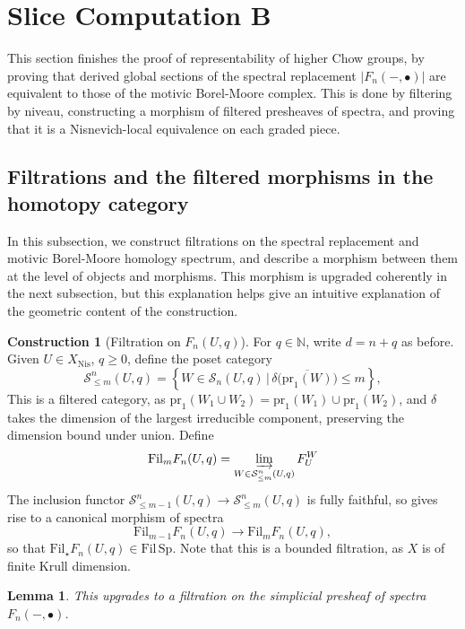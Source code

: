\documentclass[11pt, twoside]{article}
\numberwithin{equation}{section}
\newtheorem{lemma}[equation]{Lemma}
\theoremstyle{definition}
\newtheorem{construction}[equation]{Construction}
\newcommand{\bb}[1]{\mathbb{#1}}
\newcommand{\colim}{\varinjlim}
\newcommand{\pr}{\mathrm{pr}}
\newcommand{\fil}{\mathrm{Fil}}
\newcommand{\Sp}{\mathrm{Sp}}
\newcommand{\nis}{\mathrm{Nis}}
\begin{document}
\section{Slice Computation B}\label{slice-comp-B}
This section finishes the proof of representability of higher Chow groups, by proving that derived global sections of the spectral replacement \(|F_n( -, \bullet)|\) are equivalent to those of the motivic Borel-Moore complex. This is done by filtering by niveau, constructing a morphism of filtered presheaves of spectra, and proving that it is a Nisnevich-local equivalence on each graded piece.

\subsection{Filtrations and the filtered morphisms in the homotopy category}

In this subsection, we construct filtrations on the spectral replacement and motivic Borel-Moore homology spectrum, and describe a morphism between them at the level of objects and morphisms. This morphism is upgraded coherently in the next subsection, but this explanation helps give an intuitive explanation of the geometric content of the construction.

\begin{construction}[Filtration on \(F_n(U, q)\)]
For \(q \in \bb{N}\), write \(d = n + q\) as before. Given \(U \in X_\nis\), \(q \geq 0\), define the poset category 
\[\mathcal{S}_{\leq m}^n(U, q) = \left\{W \in \mathcal{S}_n(U, q) \, \big| \, \delta\big(\overline{\pr_1(W)}\big) \leq m\right\},\]
This is a filtered category, as \(\pr_1(W_1 \cup W_2) = \pr_1(W_1) \cup \pr_1(W_2)\), and \(\delta\) takes the dimension of the largest irreducible component, preserving the dimension bound under union. Define 
\[\fil_m F_n(U, q) = \colim_{W \in \mathcal{S}_{\leq m}^n(U, q)} F_U^W\]
The inclusion functor \(\mathcal{S}_{\leq m - 1}^n(U, q) \to \mathcal{S}_{\leq m}^n(U, q)\) is fully faithful, so gives rise to a canonical morphism of spectra 
\[\fil_{m - 1} F_n(U, q) \to \fil_m F_n(U, q),\]
so that \(\fil_\star F_n(U, q) \in \fil \, \Sp\). Note that this is a bounded filtration, as \(X\) is of finite Krull dimension.
\end{construction}

\begin{lemma}
This upgrades to a filtration on the simplicial presheaf of spectra \(F_n( -, \bullet)\).
\end{lemma}
\end{document}
